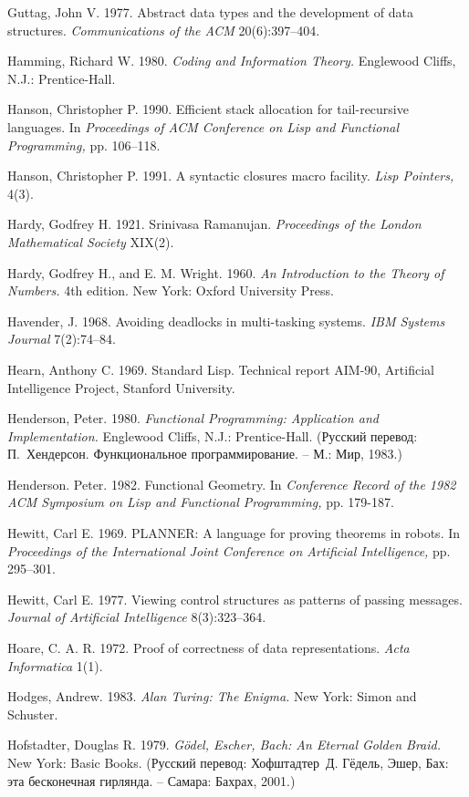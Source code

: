 {Guttag, John V.  1977.  Abstract data types and the development of
data structures.  {\em Communications of the ACM} 20(6):397--404.

Hamming, Richard W.  1980.  {\em Coding and Information Theory.}
Englewood Cliffs, N.J.: Prentice-Hall.

Hanson, Christopher P.  1990.  Efficient stack allocation for
tail-recursive languages.  In {\em Proceedings of ACM Conference on
Lisp and Functional Programming,} pp. 106--118.

Hanson, Christopher P.  1991.  A syntactic closures macro facility.
{\em Lisp Pointers,} 4(3).

Hardy, Godfrey H.  1921.  Srinivasa Ramanujan.  {\em Proceedings of
the London Ma\-the\-matical Society} XIX(2).

Hardy, Godfrey H., and E. M. Wright.  1960.  {\em An Introduction to
the Theory of Numbers.}  4th edition.  New York: Oxford University
Press.

Havender, J. 1968. Avoiding deadlocks in multi-tasking systems. {\em IBM Systems Journal} 7(2):74--84.

Hearn, Anthony C.  1969.  Standard Lisp.  Technical report AIM-90,
Artificial Intel\-li\-gence Project, Stanford University.

Henderson, Peter. 1980.  {\em Functional Programming: Application and
Imp\-le\-men\-ta\-tion.} Englewood Cliffs, N.J.: Prentice-Hall. (Русский
перевод: П.~Хендерсон. Функциональное программирование. -- М.: Мир, 1983.)

Henderson. Peter. 1982. Functional Geometry. In {\em Conference Record
of the 1982 ACM Symposium on Lisp and Functional Programming,}
pp. 179-187.

Hewitt, Carl E.  1969.  PLANNER: A language for proving theorems in
robots.  In {\em Proceedings of the International Joint Conference on
Artificial Intelligence,} pp. 295--301.

Hewitt, Carl E.  1977.  Viewing control structures as patterns of
passing messages.  {\em Journal of Artificial Intelligence}
8(3):323--364.

Hoare, C. A. R. 1972.  Proof of correctness of data representations.
{\em Acta Informa\-tica} 1(1).

Hodges, Andrew. 1983.  {\em Alan Turing: The Enigma.} New York: Simon
and Schuster.

Hofstadter, Douglas R.  1979.  {\em G\"odel, Escher, Bach: An Eternal
Golden Braid.} New York: Basic Books. (Русский перевод: Хофштадтер~Д.
Гёдель, Эшер, Бах: эта бесконечная гирлянда. -- Самара: Бахрах, 2001.)

}
